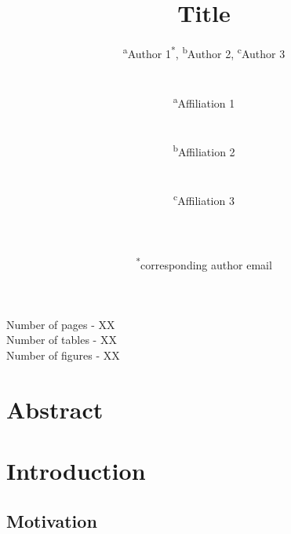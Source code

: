 \documentclass[11pt,a4paper]{article}
\begin{document}
\begin{titlepage}
    \title{Title}
    \author{
        \textsuperscript{a}Author 1\textsuperscript{*}, 
        \textsuperscript{b}Author 2, 
        \textsuperscript{c}Author 3
        \\ \\ \\
        \textsuperscript{a}Affiliation 1\\ 
        \\ \\
        \textsuperscript{b}Affiliation 2\\ 
        \\ \\
        \textsuperscript{c}Affiliation 3\\
        \\ \\ \\
        \textsuperscript{*}corresponding author email
    }
\clearpage %
\maketitle
\vspace*{\fill}
\begin{flushright}{
        \noindent Number of pages - XX \\
        \noindent Number of tables - XX \\
        \noindent Number of figures - XX
}
\end{flushright}
\thispagestyle{empty} %
\end{titlepage}

\onehalfspacing %
\linenumbers %
\pagewiselinenumbers %
\modulolinenumbers[3] %

\section*{Abstract} \label{sec-abstract}

\newpage

\section{Introduction} \label{sec-introduction}
\subsection{Motivation} \label{sec-motivation}
\end{document}
